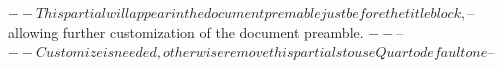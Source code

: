 $-- This partial will appear in the document premable just before the title block,
$-- allowing further customization of the document preamble.
$--
$-- %
$-- Customize is needed, otherwise remove this partials to use Quarto default one
$-- %